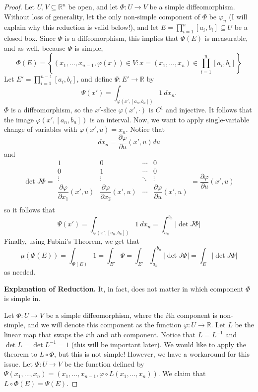 \documentclass{article}
\theoremstyle{plain} %
\numberwithin{thm}{section} %
\theoremstyle{definition}
\begin{document}
    \begin{proof}
        Let \(U,V \subseteq \mathbb{R}^n\) be open, and let \(\Phi : U \to V\) be a simple diffeomorphism. Without loss of generality, let the only non-simple component of \(\Phi\) be \(\varphi _n\) (I will explain why this reduction is valid below!), and let \(E = \prod_{i=1}^n [a_i, b_i] \subseteq U\) be a closed box. Since \(\Phi\) is a diffeomorphism, this implies that \(\Phi (E)\) is measurable, and as well, because \(\Phi\) is simple,
        \[
            \Phi (E) = \left\{ (x_1, ..., x_{n-1}, \varphi (x)) \in V : x = (x_1, ..., x_n) \in \prod_{i=1}^{n} [a_i, b_i] \right\} 
        \]
        Let \(E' = \prod_{i=1}^{n-1} [a_i, b_i]\), and define \(\Psi : E' \to \mathbb{R}\) by
        \[
            \Psi (x') = \int_{\varphi (x', [a_n, b_n])} 1\ dx_n.
        \]
        \(\Phi\) is a diffeomorphism, so the \(x'\)-slice \(\varphi(x', \cdot)\) is \(C^1\) and injective. It follows that the image \(\varphi(x', [a_n, b_n])\) is an interval. Now, we want to apply single-variable change of variables with \(\varphi (x', u) = x_n\). Notice that
        \[
            dx_n = \frac{\partial \varphi }{\partial u}(x', u) du
        \]
        and
        \[
            \det J \Phi = \begin{array}{|cccc|}
                1 & 0 & \cdots &  0 \\
                0 & 1 & \cdots &  0 \\
                \vdots & \vdots & \ddots &  \vdots \\
                \dfrac{\partial \varphi }{\partial x_1}(x', u) & \dfrac{\partial \varphi }{\partial x_2}(x', u) & \cdots & \dfrac{\partial \varphi }{\partial u}(x', u) \\
            \end{array} = \frac{\partial \varphi }{\partial u}(x', u)
        \]
        so it follows that
        \[
            \Psi (x') = \int_{\varphi (x', [a_n, b_n])} 1\ dx_n = \int _{a_n}^{b_n} |\det J \Phi |
        \]
        Finally, using Fubini's Theorem, we get that
        \[
            \mu (\Phi (E)) = \int _{\Phi (E)} 1 = \int _{E'} \Psi = \int _{E'} \int_{a_n}^{b_n} |\det J \Phi | = \int _E |\det J \Phi |
        \]
        as needed.

        \textbf{Explanation of Reduction.} It, in fact, does not matter in which component \(\Phi\) is simple in.
        
        Let \(\Phi: U \to V\) be a simple diffeomorphism, where the \(i\)th component is non-simple, and we will denote this component as the function \(\varphi : U \to \mathbb{R}\). Let \(L\) be the linear map that swaps the \(i\)th and \(n\)th component. Notice that \(L = L^{-1}\) and \(\det L = \det L^{-1} = 1\) (this will be important later). We would like to apply the theorem to \(L \circ \Phi\), but this is not simple! However, we have a workaround for this issue. Let \(\Psi : U \to V\) be the function defined by \(\Psi (x_1, ..., x_n) = (x_1, ..., x_{n-1}, \varphi \circ L(x_1, ..., x_n))\). We claim that \(L \circ \Phi (E) = \Psi (E)\).


\end{proof}
\end{document}
